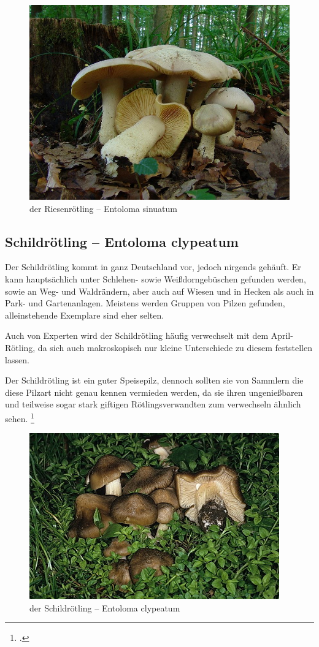 \documentclass[a4paper,abstracton]{scrreprt}
\begin{document}
\begin{figure}[H]
\centering
\includegraphics[scale=0.2]{riesenroetling}
\caption{der Riesenrötling -- Entoloma sinuatum }
\label{fig:riesenroetling}
\end{figure}

\subsection{Schildrötling -- Entoloma clypeatum}
Der Schildrötling kommt in ganz Deutschland vor, jedoch nirgends gehäuft. Er kann hauptsächlich unter Schlehen- sowie Weißdorngebüschen gefunden werden, sowie an Weg- und Waldrändern, aber auch auf Wiesen und in Hecken als auch in Park- und Gartenanlagen. Meistens werden Gruppen von Pilzen gefunden, alleinstehende Exemplare sind eher selten. 

Auch von Experten wird der Schildrötling häufig verwechselt mit dem April-Rötling, da sich auch makroskopisch nur kleine Unterschiede zu diesem feststellen lassen.

Der Schildrötling ist ein guter Speisepilz, dennoch sollten sie von Sammlern die diese Pilzart nicht genau kennen vermieden werden, da sie ihren ungenießbaren und teilweise sogar stark giftigen Rötlingsverwandten zum verwechseln ähnlich sehen.
\footcite{schildroetling}

\begin{figure}[H]
\centering
\includegraphics[scale=22]{schildroetling}
\caption{der Schildrötling -- Entoloma clypeatum }
\label{fig:schildroetling}
\end{figure}
\end{document}
